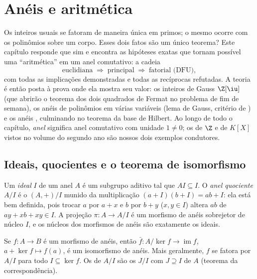 \chapter{Anéis e aritmética}\label{ch:b3:rings}

Os inteiros usuais se fatoram de maneira única em primos; o mesmo
ocorre com os polinômios sobre um corpo. Esses dois fatos são um único
teorema? Este capítulo responde que sim e encontra as hipóteses exatas
que tornam possível uma ``aritmética'' em um anel comutativo: a cadeia
\[
\text{euclidiana} \;\Longrightarrow\; \text{principal}
\;\Longrightarrow\; \text{fatorial (DFU)},
\]
com todas as implicações demonstradas e todas as recíprocas refutadas.
A teoria é então posta à prova onde ela mostra seu valor: os inteiros
de Gauss $\Z[\iu]$ (que abrirão o teorema dos dois quadrados de Fermat no
problema de fim de semana), os anéis de polinômios em várias variáveis
(lema de Gauss, critério de ) e os anéis ,
culminando no teorema da base de Hilbert. Ao longo de todo o capítulo,
\emph{anel} significa anel comutativo com unidade $1 \neq 0$; os  de
$\Z$ e de $K[X]$ vistos no volume do segundo ano são nossos dois
exemplos condutores.

\section{Ideais, quocientes e o teorema de isomorfismo}

\begin{definition}\label{def:b3:rings:ideal}
Um \emph{ideal} $I$ de um anel $A$ é um subgrupo
aditivo tal que $AI \subseteq I$. O \emph{anel quociente}
$A/I$ é o  $(A, +)/I$ munido da multiplicação $(a + I)(b + I) = ab + I$: ela está
bem definida, pois trocar $a$ por $a + x$ e $b$ por
$b + y$ ($x, y \in I$) altera $ab$ de $ay + xb + xy \in I$. A projeção $\pi \colon A
\to A/I$ é um morfismo
de anéis sobrejetor de núcleo $I$, e os núcleos dos morfismos de
anéis são exatamente os ideais.
\end{definition}

\begin{theorem}\label{thm:b3:rings:firstiso}
Se $f \colon A \to B$ é um morfismo de anéis, então $\bar f\colon
A/\ker f \to \operatorname{im} f$, $a + \ker f \mapsto f(a)$, é um isomorfismo de
anéis. Mais geralmente, $f$ se fatora por $A/I$ para todo 
$I \subseteq \ker f$. Os  de $A/I$ são os $J/I$ com $J \supseteq I$  de $A$
(teorema da correspondência).
\end{theorem}

